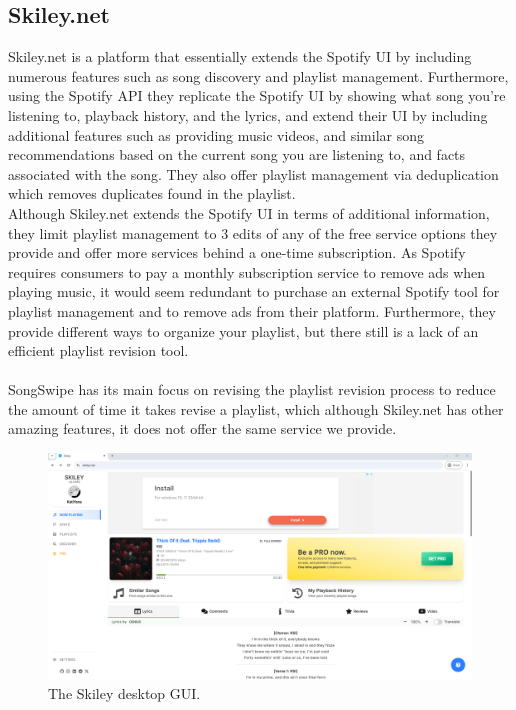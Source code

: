 \documentclass{article}
\begin{document}
\pagebreak

\subsection{Skiley.net}
\quad Skiley.net is a platform that essentially extends the Spotify UI by including numerous features such as song discovery and playlist management. Furthermore, using the Spotify API they replicate the Spotify UI by showing what song you’re listening to, playback history, and the lyrics,  and extend their UI by including additional features such as providing music videos, and similar song recommendations based on the current song you are listening to, and facts associated with the song. They also offer playlist management via deduplication which removes duplicates found in the playlist. \cite{skiley} \\

Although Skiley.net extends the Spotify UI in terms of additional information, they limit playlist management to 3 edits of any of the free service options they provide and offer more services behind a one-time subscription. As Spotify requires consumers to pay a monthly subscription service to remove ads when playing music, it would seem redundant to purchase an external Spotify tool for playlist management and to remove ads from their platform. Furthermore, they provide different ways to organize your playlist, but there still is a lack of an efficient playlist revision tool. \\
\\
\quad SongSwipe has its main focus on revising the playlist revision process to reduce the amount of time it takes revise a playlist, which although Skiley.net has other amazing features, it does not offer the same service we provide.

\begin{figure}[ht]
  \centering
  \includegraphics[width=\textwidth]{./skileyss.png}
  \caption{The Skiley desktop GUI.}
  \label{fig:skiley}
\end{figure}
\end{document}
